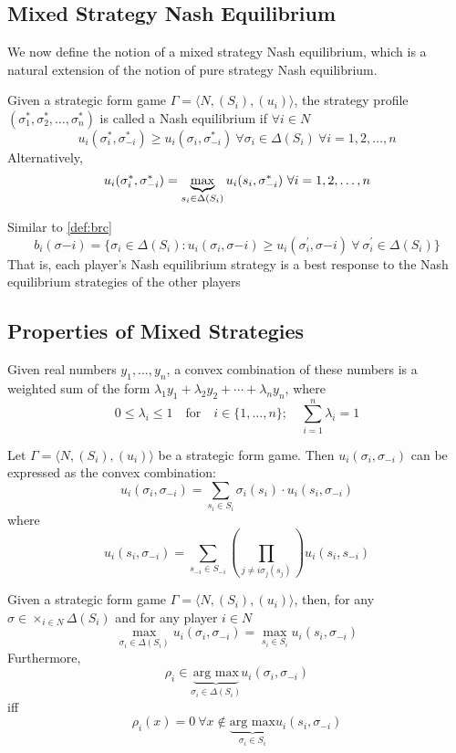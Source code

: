 \subsection{Mixed Strategy Nash Equilibrium}
We now define the notion of a mixed strategy Nash equilibrium, which is a natural extension of the notion of pure strategy Nash equilibrium.
\begin{defn}
Given a strategic form game $\Gamma = \langle N,(S_i),(u_i)\rangle$, the strategy profile $(\sigma_1^*,\sigma_2^*,\ldots,\sigma_n^*)$ is called a Nash equilibrium if $\forall i\in N$
\[u_i(\sigma^*_i,\sigma^*_{-i})\geq u_i(\sigma_i,\sigma^*_{-i})\ \forall \sigma_{i} \in \Delta(S_{i})\ \forall i=1,2,\ldots,n\]
Alternatively,
\[u_i(\sigma^*_i,\sigma^*_{-i})= \underbrace{\op{max}}_{s_{i} \in \Delta(S_{i})} u_i(s_i,\sigma^*_{-i})\ \forall i=1,2,\ldots,n\]
\end{defn}
Similar to \ref{def:brc}
\[b_i(\sigma{-i}) = \{\sigma_i \in \Delta(S_i) : u_i(\sigma_i, \sigma{-i}) \geq u_i(\sigma^\prime_i, \sigma{-i}) \ \forall\  \sigma^\prime_i \in \Delta(S_i)\}\]
That is, each player’s Nash equilibrium strategy is a best response to the Nash equilibrium strategies of the other players
\subsection{Properties of Mixed Strategies}
\begin{defn}
	Given real numbers $y_1,\ldots,y_n$, a convex combination of these numbers is a weighted sum of the form $\lambda_1y_1 + \lambda_2y_2 + \cdots + \lambda_ny_n$, where
	\[0\leq \lambda_i\leq1 \quad \text{for}\quad i \in \{1,\ldots,n\};\quad \sum_{i=1}^{n}\lambda_i=1\]
\end{defn}
\begin{prop}
	Let $\Gamma = \langle N,(S_i),(u_i)\rangle$ be a strategic form game.
	Then $u_i(\sigma_i, \sigma_{-i})$ can be expressed as the convex combination:
	\[u_i(\sigma_i,\sigma_{-i})=\sum_{s_i\in S_i} \sigma_i(s_i)\cdot u_i(s_i,\sigma_{-i})\]
	where
	\[u_i(s_i,\sigma_{-i})=\sum_{s_{-i}\in S_{-i}} \left(\prod_{j\neq i \sigma_j(s_j)}\right)u_i(s_i,s_{-i})\]
\end{prop}
\begin{prop}
	Given a strategic form game $\Gamma = \langle N,(S_i),(u_i)\rangle$, then, for any $\sigma\in \times_{i\in N}\Delta(S_i)$ and for any player $i\in N$
	\[\max_{\sigma_i\in\Delta(S_i)}u_i(\sigma_i,\sigma_{-i})=\max_{s_i\in S_i} u_{i}(s_i,\sigma_{-i})\]
	Furthermore,
	\[\rho_i\in \underbrace{\text{arg max}}_{\sigma_{i}\in \Delta(S_i)}u_i(\sigma_i,\sigma_{-i})\]
	iff
	\[\rho_i(x)=0 \ \forall x\notin \underbrace{\text{arg max}}_{\sigma_{i}\in S_i} u_i(s_i,\sigma_{-i})\]
\end{prop}

